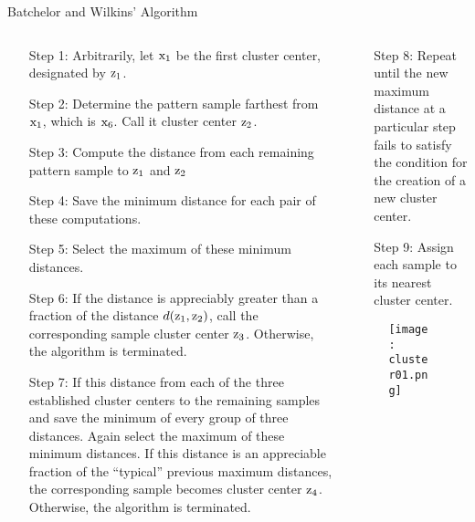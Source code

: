 \begin{frame}{Batchelor and Wilkins' Algorithm}
\begin{columns}
\begin{column}{8cm}
\begin{scriptsize}
\begin{itemize}
\setlength{\itemsep}{0pt}
\item[Step 1:] Arbitrarily, let ${\rm x_1}$ be the first cluster center, designated by ${\rm z}_1$.
\item[Step 2:]Determine the pattern sample farthest from ${\rm x}_1$, which is ${\rm x}_6$. Call it cluster center ${\rm z}_2$.
\item[Step 3:] Compute the distance from each remaining pattern sample to ${\rm z}_1$ and ${\rm z}_2$
\item[Step 4:] Save the minimum distance for each pair of these computations.
\item[Step 5:] Select the maximum of these minimum distances.
\item[Step 6:] If the distance is appreciably greater than a fraction of the distance $d({\rm z}_1,{\rm z}_2)$, call the corresponding sample cluster center ${\rm z}_3$. Otherwise, the algorithm is terminated.

\item[Step 7:] If this distance from each of the three established cluster centers to the remaining samples and save the minimum of every group of three distances. Again select the maximum of these minimum distances. If this distance is an appreciable fraction of the ``typical'' previous maximum distances, the corresponding sample becomes cluster center ${\rm z}_4$. Otherwise, the algorithm is terminated.
\end{itemize}
\end{scriptsize}
\end{column}
\begin{column}{5cm}
\begin{scriptsize}
\begin{itemize}
\setlength{\itemsep}{0pt}
\item[Step 8:] Repeat until the new maximum distance at a particular step fails to satisfy the condition for the creation of a new cluster center.
\item[Step 9:] Assign each sample to its nearest cluster center.
\end{itemize}
\end{scriptsize}
\vspace{-8pt}
\begin{figure}
\texttt{[image: cluster01.png]}
\end{figure}
\end{column}
\end{columns}
\end{frame}


